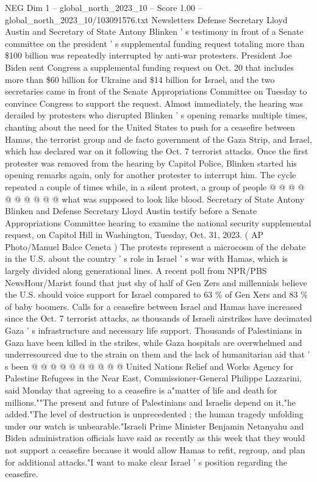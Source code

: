 \begin{textsample}{NEG Dim 1 – global\_north\_2023\_10 – Score 1.00 – global\_north\_2023\_10/103091576.txt}  \label{ex:f1_neg_312}
Newsletters Defense Secretary Lloyd Austin and Secretary of State Antony Blinken ' s testimony in front of a Senate committee on the president ' s supplemental funding request totaling more than \$100 billion was repeatedly interrupted by anti-war protesters.
President Joe Biden sent Congress a supplemental funding request on Oct. 20 that includes more than \$60 billion for Ukraine and \$14 billion for Israel, and the two secretaries came in front of the Senate Appropriations Committee on Tuesday to convince Congress to support the request.
Almost immediately, the hearing was derailed by protesters who disrupted Blinken ' s opening remarks multiple times, chanting about the need for the United States to push for a ceasefire between Hamas, the terrorist group and de facto government of the Gaza Strip, and Israel, which has declared war on it following the Oct. 7 terrorist attacks.
Once the first protester was removed from the hearing by Capitol Police, Blinken started his opening remarks again, only for another protester to interrupt him.
The cycle repeated a couple of times while, in a silent protest, a group of people @ @ @ @ @ @ @ @ @ @ what was supposed to look like blood.
Secretary of State Antony Blinken and Defense Secretary Lloyd Austin testify before a Senate Appropriations Committee hearing to examine the national security supplemental request, on Capitol Hill in Washington, Tuesday, Oct. 31, 2023. ( AP Photo/Manuel Balce Ceneta ) The protests represent a microcosm of the debate in the U.S. about the country ' s role in Israel ' s war with Hamas, which is largely divided along generational lines.
A recent poll from NPR/PBS NewsHour/Marist found that just shy of half of Gen Zers and millennials believe the U.S. should voice support for Israel compared to 63 \% of Gen Xers and 83 \% of baby boomers.
Calls for a ceasefire between Israel and Hamas have increased since the Oct. 7 terrorist attacks, as thousands of Israeli airstrikes have decimated Gaza ' s infrastructure and necessary life support.
Thousands of Palestinians in Gaza have been killed in the strikes, while Gaza hospitals are overwhelmed and underresourced due to the strain on them and the lack of humanitarian aid that ' s been @ @ @ @ @ @ @ @ @ @ United Nations Relief and Works Agency for Palestine Refugees in the Near East, Commissioner-General Philippe Lazzarini, said Monday that agreeing to a ceasefire is a"matter of life and death for millions.""The present and future of Palestinians and Israelis depend on it,"he added."The level of destruction is unprecedented ; the human tragedy unfolding under our watch is unbearable."Israeli Prime Minister Benjamin Netanyahu and Biden administration officials have said as recently as this week that they would not support a ceasefire because it would allow Hamas to refit, regroup, and plan for additional attacks."I want to make clear Israel ' s position regarding the ceasefire.

\end{textsample}
